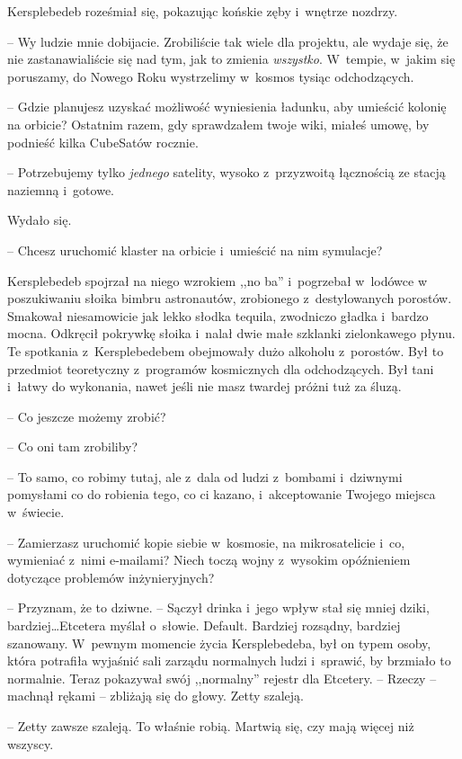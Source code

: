 \documentclass[oneside,polish,11pt,sfheadings]{mwbk}
\begin{document}
Kersplebedeb roześmiał się, pokazując końskie zęby i~wnętrze nozdrzy. 

-- Wy ludzie mnie dobijacie. Zrobiliście tak wiele dla projektu, ale wydaje
się, że nie zastanawialiście się nad tym, jak to zmienia
\textit{wszystko}. W~tempie, w~jakim się poruszamy, do Nowego Roku
wystrzelimy w~kosmos tysiąc odchodzących.

-- Gdzie planujesz uzyskać możliwość wyniesienia ładunku, aby umieścić
kolonię na orbicie? Ostatnim razem, gdy sprawdzałem twoje wiki, miałeś
umowę, by podnieść kilka CubeSatów rocznie.

-- Potrzebujemy tylko \textit{jednego} satelity, wysoko z~przyzwoitą
łącznością ze stacją naziemną i~gotowe.

Wydało się. 

-- Chcesz uruchomić klaster na orbicie i~umieścić na nim
symulacje?

Kersplebedeb spojrzał na niego wzrokiem ,,no ba'' i~pogrzebał w~lodówce
w poszukiwaniu słoika bimbru astronautów, zrobionego z~destylowanych
porostów. Smakował niesamowicie jak lekko słodka tequila, zwodniczo
gładka i~bardzo mocna. Odkręcił pokrywkę słoika i~nalał dwie małe
szklanki zielonkawego płynu. Te spotkania z~Kersplebedebem obejmowały
dużo alkoholu z~porostów. Był to przedmiot teoretyczny z~programów
kosmicznych dla odchodzących. Był tani i~łatwy do wykonania, nawet jeśli
nie masz twardej próżni tuż za śluzą.

-- Co jeszcze możemy zrobić?

-- Co oni tam zrobiliby?

-- To samo, co robimy tutaj, ale z~dala od ludzi z~bombami i~dziwnymi
pomysłami co do robienia tego, co ci kazano, i~akceptowanie Twojego
miejsca w~świecie.

-- Zamierzasz uruchomić kopie siebie w~kosmosie, na mikrosatelicie i~co,
wymieniać z~nimi e-mailami? Niech toczą wojny z~wysokim opóźnieniem
dotyczące problemów inżynieryjnych?

-- Przyznam, że to dziwne. -- Sączył drinka i~jego wpływ stał się mniej
dziki, bardziej\ldots  Etcetera myślał o~słowie. Default. Bardziej rozsądny,
bardziej szanowany. W~pewnym momencie życia Kersplebedeba, był on typem
osoby, która potrafiła wyjaśnić sali zarządu normalnych ludzi i~sprawić,
by brzmiało to normalnie. Teraz pokazywał swój ,,normalny'' rejestr dla
Etcetery. -- Rzeczy -- machnął rękami -- zbliżają się do głowy. Zetty
szaleją.

-- Zetty zawsze szaleją. To właśnie robią. Martwią się, czy mają więcej
niż wszyscy.
\end{document}
